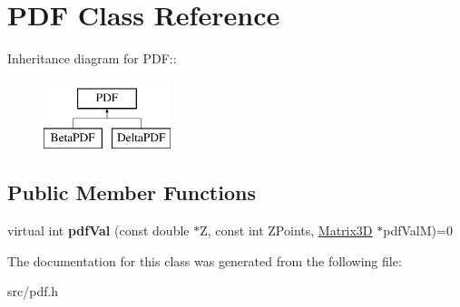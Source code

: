 \hypertarget{classPDF}{
\section{PDF Class Reference}
\label{dc/d2d/classPDF}
}
Inheritance diagram for PDF::\begin{figure}[H]
\begin{center}
\leavevmode
\includegraphics[height=2cm]{dc/d2d/classPDF}
\end{center}
\end{figure}
\subsection*{Public Member Functions}
\begin{DoxyCompactItemize}
\item 
\hypertarget{classPDF_aa1c76d504f181d271734bba54068c51b}{
virtual int {\bfseries pdfVal} (const double $\ast$Z, const int ZPoints, \hyperlink{classMatrix3D}{Matrix3D} $\ast$pdfValM)=0}
\label{dc/d2d/classPDF_aa1c76d504f181d271734bba54068c51b}

\end{DoxyCompactItemize}


The documentation for this class was generated from the following file:\begin{DoxyCompactItemize}
\item 
src/pdf.h\end{DoxyCompactItemize}
